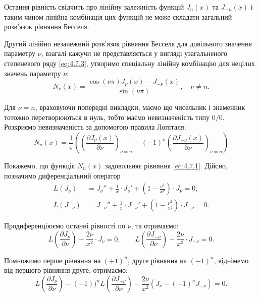 Остання рівність свідчить про лінійну залежність функцій $J_n(x)$ та $J_{-n}(x)$ і таким чином лінійна комбінація цих функцій не може складати загальний розв'язок рівняння Бесселя. \medskip

Другий лінійно незалежний розв'язок рівняння Бесселя для довільного значення параметру $\nu$, взагалі кажучи не представляється у вигляді узагальненого степеневого ряду \eqref{eq:4.7.3}, утворимо спеціальну лінійну комбінацію для нецілих значень параметру $\nu$:
\begin{equation}
	\label{eq:4.7.12}
	N_\nu(x) = \frac{\cos (\nu \pi) J_\nu(x) - J_{-\nu}(x)}{\sin(\nu\pi)}, \quad \nu \ne n.
\end{equation}

Для $\nu = n$, враховуючи попередні викладки, маємо що чисельник і знаменник тотожно перетворюються в нуль, тобто маємо невизначеність типу $0/0$. Розкриємо невизначеність за допомогою правила Лопіталя:
\begin{equation}
	\label{eq:4.7.12'}
	N_n(x) = \frac{1}{\pi} \left( \left( \frac{\partial J_\nu(x)}{\partial \nu} \right)_{\nu = n} - (-1)^n \left( \frac{\partial J_{-\nu}(x)}{\partial \nu} \right)_{\nu = n} \right)
\end{equation}

Покажемо, що функція $N_n(x)$ задовольняє рівняння \eqref{eq:4.7.1}. Дійсно, позначимо диференціальний оператор 
\begin{align}
	\label{eq:4.7.13}
	L(J_\nu) &= J_\nu'' + \frac{1}{x} \cdot J_\nu' + \left( 1 - \frac{\nu^2}{x^2} \right) \cdot J_\nu = 0, \\
	\label{eq:4.7.13'}
	L(J_{-\nu}) &= J_{-\nu}'' + \frac{1}{x} \cdot J_{-\nu}' + \left( 1 - \frac{\nu^2}{x^2} \right) \cdot J_{-\nu} = 0.
\end{align}

Продиференціюємо останні рівності по $\nu$, та отримаємо:
\begin{equation}
	L \left( \frac{\partial J_\nu}{\partial \nu} \right) - \frac{2 \nu}{x^2} \cdot J_\nu = 0, \qquad L \left( \frac{\partial J_{-\nu}}{\partial \nu} \right) - \frac{2 \nu}{x^2} \cdot J_{-\nu} = 0.
\end{equation}

Помножимо перше рівняння на $(+1)^n$, друге рівняння на $(-1)^n$, віднімемо від першого рівняння друге, отримаємо:
\begin{equation}
	L \left( \frac{\partial J_\nu}{\partial \nu} \right) - (-1))^n L \left( \frac{\partial J_{-\nu}}{\partial \nu} \right) - \frac{2 \nu}{x^2} (J_\nu - (-1)^n J_{-\nu}) = 0.
\end{equation}

